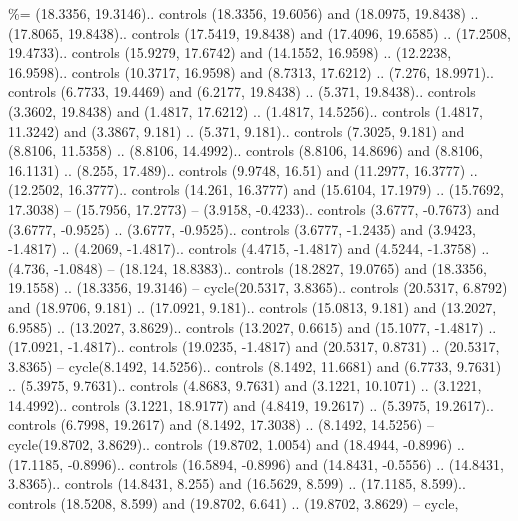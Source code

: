 \%= {(18.3356, 19.3146).. controls (18.3356, 19.6056) and (18.0975, 19.8438) .. (17.8065, 19.8438).. controls (17.5419, 19.8438) and (17.4096, 19.6585) .. (17.2508, 19.4733).. controls (15.9279, 17.6742) and (14.1552, 16.9598) .. (12.2238, 16.9598).. controls (10.3717, 16.9598) and (8.7313, 17.6212) .. (7.276, 18.9971).. controls (6.7733, 19.4469) and (6.2177, 19.8438) .. (5.371, 19.8438).. controls (3.3602, 19.8438) and (1.4817, 17.6212) .. (1.4817, 14.5256).. controls (1.4817, 11.3242) and (3.3867, 9.181) .. (5.371, 9.181).. controls (7.3025, 9.181) and (8.8106, 11.5358) .. (8.8106, 14.4992).. controls (8.8106, 14.8696) and (8.8106, 16.1131) .. (8.255, 17.489).. controls (9.9748, 16.51) and (11.2977, 16.3777) .. (12.2502, 16.3777).. controls (14.261, 16.3777) and (15.6104, 17.1979) .. (15.7692, 17.3038) -- (15.7956, 17.2773) -- (3.9158, -0.4233).. controls (3.6777, -0.7673) and (3.6777, -0.9525) .. (3.6777, -0.9525).. controls (3.6777, -1.2435) and (3.9423, -1.4817) .. (4.2069, -1.4817).. controls (4.4715, -1.4817) and (4.5244, -1.3758) .. (4.736, -1.0848) -- (18.124, 18.8383).. controls (18.2827, 19.0765) and (18.3356, 19.1558) .. (18.3356, 19.3146) -- cycle(20.5317, 3.8365).. controls (20.5317, 6.8792) and (18.9706, 9.181) .. (17.0921, 9.181).. controls (15.0813, 9.181) and (13.2027, 6.9585) .. (13.2027, 3.8629).. controls (13.2027, 0.6615) and (15.1077, -1.4817) .. (17.0921, -1.4817).. controls (19.0235, -1.4817) and (20.5317, 0.8731) .. (20.5317, 3.8365) -- cycle(8.1492, 14.5256).. controls (8.1492, 11.6681) and (6.7733, 9.7631) .. (5.3975, 9.7631).. controls (4.8683, 9.7631) and (3.1221, 10.1071) .. (3.1221, 14.4992).. controls (3.1221, 18.9177) and (4.8419, 19.2617) .. (5.3975, 19.2617).. controls (6.7998, 19.2617) and (8.1492, 17.3038) .. (8.1492, 14.5256) -- cycle(19.8702, 3.8629).. controls (19.8702, 1.0054) and (18.4944, -0.8996) .. (17.1185, -0.8996).. controls (16.5894, -0.8996) and (14.8431, -0.5556) .. (14.8431, 3.8365).. controls (14.8431, 8.255) and (16.5629, 8.599) .. (17.1185, 8.599).. controls (18.5208, 8.599) and (19.8702, 6.641) .. (19.8702, 3.8629) -- cycle},

